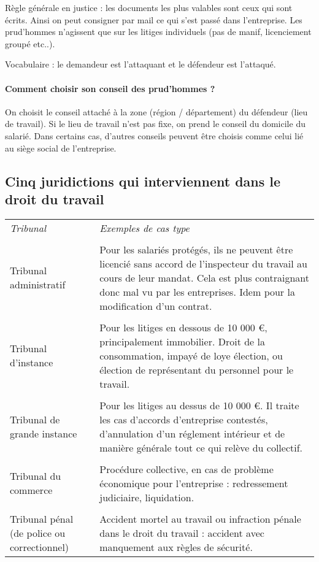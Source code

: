 	Règle générale en justice : les documents les plus valables sont ceux qui sont écrits. Ainsi on peut consigner par mail ce qui s’est passé dans l’entreprise.
	Les prud'hommes n'agissent que sur les litiges individuels (pas de manif, licenciement groupé etc..).
	
	Vocabulaire : le demandeur est l'attaquant et le défendeur est l'attaqué.
	
	\paragraph{Comment choisir son conseil des prud'hommes ?}
	On choisit le conseil attaché à la zone (région / département) du défendeur (lieu de travail).
	Si le lieu de travail n’est pas fixe, on prend le conseil du domicile du salarié.
	Dans certains cas, d’autres conseils peuvent être choisis comme celui lié au siège social de l'entreprise.


\subsection{Cinq juridictions qui interviennent dans le droit du travail}

	\begin{tabular}{m{4cm}|m{11cm}}
	\textit{Tribunal} & \textit{Exemples de cas type} \\ \\

	Tribunal administratif & Pour les salariés protégés, ils ne peuvent être licencié sans accord de l’inspecteur du travail au cours de leur mandat. Cela est plus contraignant donc mal vu par les entreprises. Idem pour la modification d'un contrat. \\ \\

	Tribunal d’instance & Pour les litiges en dessous de 10 000 \euro, principalement immobilier. Droit de la consommation, impayé de loye élection, ou élection de représentant du personnel pour le travail. \\ \\

	Tribunal de grande instance & Pour les litiges au dessus de 10 000 \euro. Il traite les cas d'accords d'entreprise contestés, d'annulation d'un réglement intérieur et de manière générale tout ce qui relève du collectif. \\ \\

	Tribunal du commerce & Procédure collective, en cas de problème économique pour l'entreprise : redressement judiciaire, liquidation. \\ \\

	Tribunal pénal (de police ou correctionnel) & Accident mortel au travail ou infraction pénale dans le droit du travail : accident avec manquement aux règles de sécurité.
	\end{tabular}\\
	
